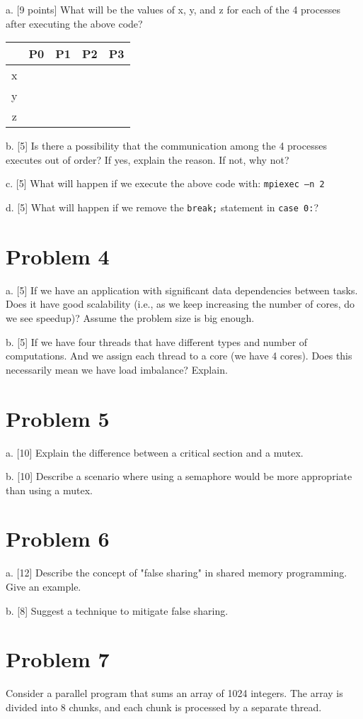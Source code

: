 \documentclass{article}
\begin{document}
a. [9 points] What will be the values of x, y, and z for each of the 4 processes after executing the above code?

\begin{tabular}{|c|c|c|c|c|}
\hline
 & P0 & P1 & P2 & P3 \\ \hline
x &  &  &  &  \\ \hline
y &  &  &  &  \\ \hline
z &  &  &  &  \\ \hline
\end{tabular}

b. [5] Is there a possibility that the communication among the 4 processes executes out of order? If yes, explain the reason. If not, why not?

c. [5] What will happen if we execute the above code with: \texttt{mpiexec –n 2}

d. [5] What will happen if we remove the \texttt{break;} statement in \texttt{case 0:}?


\section*{Problem 4}
a. [5] If we have an application with significant data dependencies between tasks. Does it have good scalability (i.e., as we keep increasing the number of cores, do we see speedup)? Assume the problem size is big enough.

b. [5] If we have four threads that have different types and number of computations. And we assign each thread to a core (we have 4 cores). Does this necessarily mean we have load imbalance? Explain.

\section*{Problem 5}
a. [10] Explain the difference between a critical section and a mutex.

b. [10] Describe a scenario where using a semaphore would be more appropriate than using a mutex.


\section*{Problem 6}
a. [12] Describe the concept of "false sharing" in shared memory programming.  Give an example.

b. [8]  Suggest a technique to mitigate false sharing.


\section*{Problem 7}
Consider a parallel program that sums an array of 1024 integers.  The array is divided into 8 chunks, and each chunk is processed by a separate thread.
\end{document}
